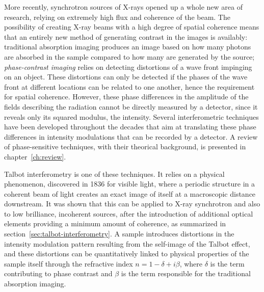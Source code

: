More recently, synchrotron sources of X-rays opened up a whole new area of
research, relying on extremely high flux and coherence of the beam. The
possibility of creating X-ray beams with a high degree of spatial coherence
means that an entirely new method of generating contrast in the images is
availably: traditional absorption imaging produces an image based on how
many photons are absorbed in the sample compared to how many are generated
by the source; \emph{phase-contrast imaging} relies on detecting distortions
of a wave front impinging on an object. These distortions can only
be detected if the phases of the wave front at different locations can be
related to one another, hence the requirement for spatial coherence.
However, these phase differences in the amplitude of the fields describing
the radiation cannot be directly measured by a detector, since it reveals
only its squared modulus, the intensity. Several interferometric techniques
have been developed throughout the decades that aim at translating these
phase differences in intensity modulations that can be recorded by a
detector. A review of phase-sensitive techniques, with their theorical
background, is presented in
chapter~\ref{ch:review}.

Talbot interferometry is one of these techniques. It relies on a physical
phenomenon, discovered in 1836 for visible light, where a periodic structure
in a coherent beam of light creates an exact image of itself at a
macroscopic distance downstream. It was shown that this can be applied to
X-ray synchrotron and also to low brilliance, incoherent sources, after the
introduction of additional optical elements providing a minimum amount of
coherence, as summarized in section~\ref{sec:talbot-interferometry}.
A sample introduces distortions in the intensity modulation pattern
resulting from the self-image of the Talbot effect, and these distortions
can be quantitatively linked to physical properties of the sample itself
through the refractive index $n = 1 - \delta + i\beta$, where $\delta$ is
the term contributing to phase contrast and $\beta$ is the term responsible
for the traditional absorption imaging.

